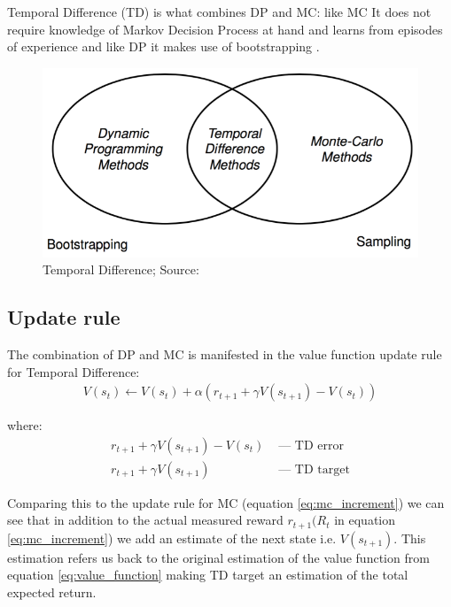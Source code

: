 Temporal Difference (TD) is what combines DP and MC: like MC It does not require knowledge of Markov Decision Process at hand and 
learns from episodes of experience and like DP it makes use of bootstrapping \cite{lecture_mfl}.

\begin{figure}[h!]
  \centering
  \includegraphics[scale=0.5]{figures/TD_diagrams.PNG}
  \caption{Temporal Difference; Source: \cite{lecture_mfl}}
  \label{fig:td}
\end{figure}

\subsection{Update rule}
The combination of DP and MC is manifested in the value function update rule for Temporal Difference:
\begin{align}
  V(s_t) \longleftarrow V(s_t) + \alpha (r_{t+1} + \gamma V(s_{t+1}) - V(s_t)) \label{eq:td_update}
\end{align}

where:
\begin{align*}
  r_{t+1} + \gamma V(s_{t+1}) - V(s_t) &\text{ — } \text{TD error}\\
  r_{t+1} + \gamma V(s_{t+1}) &\text { — } \text{TD target}
\end{align*}

Comparing this to the update rule for MC (equation \ref{eq:mc_increment}) we can see that in addition to the actual measured reward $r_{t+1} (R_{t}$ in equation \ref{eq:mc_increment}) we add an estimate of the next state i.e. $V(s_{t+1})$. This estimation refers us back to the original estimation of the value function from equation \ref{eq:value_function} making TD target an estimation of the total expected return.\\

